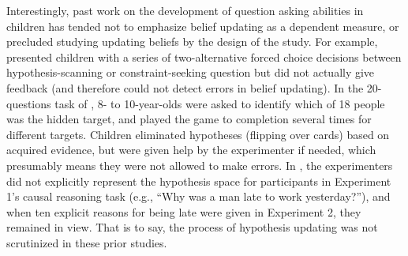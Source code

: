 \documentclass[man,floatsintext]{apa6}
\begin{document}
Interestingly, past work on the development of question asking abilities in children has tended not 
to emphasize belief updating as a dependent measure, or precluded studying updating beliefs by the design of
the study.  For example, 
 presented children with a series of two-alternative forced choice decisions between 
hypothesis-scanning or constraint-seeking question but did not actually give feedback (and therefore
could not detect errors in belief updating).
In the 20-questions task of , 8- to 10-year-olds were asked to identify which of 18 people was the hidden target, and played the game to completion several times for different targets. Children eliminated
hypotheses (flipping over cards) based on acquired evidence, but were given help by the experimenter if needed, which presumably means they were not allowed to make errors. 
 In , the experimenters did not explicitly represent the hypothesis space for participants
in Experiment 1's causal reasoning task (e.g., ``Why was a man late to work yesterday?''), and when ten 
explicit reasons for being late were given in Experiment 2, they remained in view.  That is to say, the process 
of hypothesis updating was not scrutinized in these prior studies.

\end{document}
